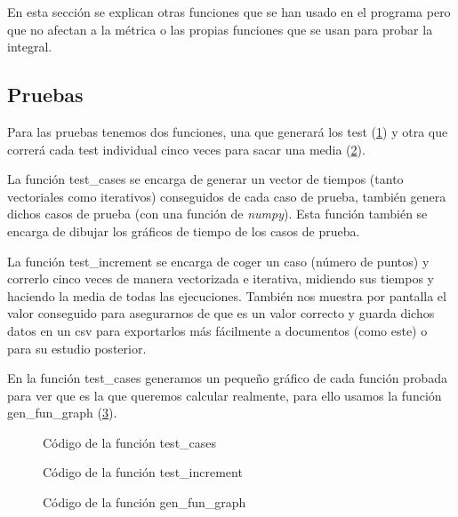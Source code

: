 \documentclass[6pt]{../../shared/AiTex}
\begin{document}
En esta sección se explican otras funciones que se han usado en el programa pero que no afectan a la métrica o las propias funciones que se usan para probar la integral.

\subsection{Pruebas}
Para las pruebas tenemos dos funciones, una que generará los test (\ref{fig:test_cases}) y otra que correrá cada test individual cinco veces para sacar una media (\ref{fig:test_increment}).

La función \textcolor{codepurple}{test\_cases} se encarga de generar un vector de tiempos (tanto vectoriales como iterativos) conseguidos de cada caso de prueba, también genera dichos casos de prueba (con una función de \textit{numpy}). Esta función también se encarga de dibujar los gráficos de tiempo de los casos de prueba.

La función \textcolor{codepurple}{test\_increment} se encarga de coger un caso (número de puntos) y correrlo cinco veces de manera vectorizada e iterativa, midiendo sus tiempos y haciendo la media de todas las ejecuciones. También nos muestra por pantalla el valor conseguido para asegurarnos de que es un valor correcto y guarda dichos datos en un csv para exportarlos más fácilmente a documentos (como este) o para su estudio posterior.

En la función \textcolor{codepurple}{test\_cases} generamos un pequeño gráfico de cada función probada para ver que es la que queremos calcular realmente, para ello usamos la función \textcolor{codepurple}{gen\_fun\_graph} (\ref{fig:gen_fun_graph}).

\begin{figure}[H]
    \centering
    
    \caption{Código de la función test\_cases}
    \label{fig:test_cases}
\end{figure}

\begin{figure}[H]
    \centering
    
    \caption{Código de la función test\_increment}
    \label{fig:test_increment}
\end{figure}

\begin{figure}[H]
    \centering
    
    \caption{Código de la función gen\_fun\_graph}
    \label{fig:gen_fun_graph}
\end{figure}
\end{document}
